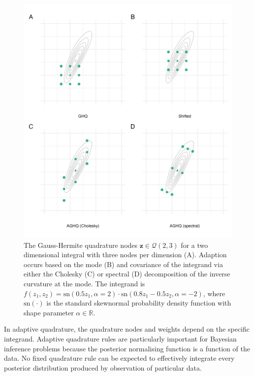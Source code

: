 \documentclass[a4paper, nobind]{templates/ociamthesis}
\begin{document}
\begin{figure}

{\centering \includegraphics[width=0.95\linewidth]{figures/naomi-aghq/aghq-demo} 

}

\caption{The Gauss-Hermite quadrature nodes \(\mathbf{z} \in \mathcal{Q}(2, 3)\) for a two dimensional integral with three nodes per dimension (A). Adaption occurs based on the mode (B) and covariance of the integrand via either the Cholesky (C) or spectral (D) decomposition of the inverse curvature at the mode. The integrand is \(f(z_1, z_2) = \text{sn}(0.5 z_1, \alpha = 2) \cdot \text{sn}(0.8 z_1 - 0.5 z_2, \alpha = -2)\), where \(\text{sn}(\cdot)\) is the standard skewnormal probability density function with shape parameter \(\alpha \in \mathbb{R}\).}\label{fig:aghq-demo}
\end{figure}

In adaptive quadrature, the quadrature nodes and weights depend on the specific integrand.
Adaptive quadrature rules are particularly important for Bayesian inference problems because the posterior normalising function is a function of the data.
No fixed quadrature rule can be expected to effectively integrate every posterior distribution produced by observation of particular data.
\end{document}
